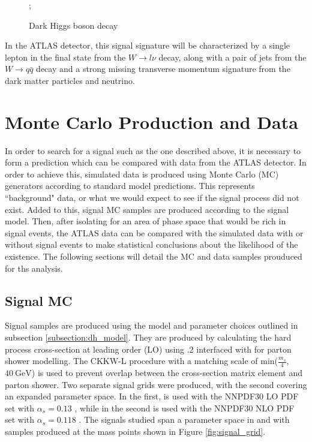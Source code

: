 \begin{figure}[H]
    \centering
    ;
    \caption{Dark Higgs boson decay}
    \label{fig:dh_feynman}
\end{figure}

In the ATLAS detector, this signal signature will be characterized by a single lepton in the final state from the $ W \rightarrow l\nu $ decay, along with a pair of jets from the $ W \rightarrow q\bar{q} $ decay and a strong missing transverse momentum signature from the dark matter particles and neutrino.

\section{Monte Carlo Production and Data}
\label{section:mc_prod}
In order to search for a signal such as the one described above, it is necessary to form a prediction which can be compared with data from the ATLAS detector. In order to achieve this, simulated data is produced using Monte Carlo (MC) generators according to standard model predictions. This represents ``background" data, or what we would expect to see if the signal process did not exist. Added to this, signal MC samples are produced according to the signal model. Then, after isolating for an area of phase space that would be rich in signal events, the ATLAS data can be compared with the simulated data with or without signal events to make statistical conclusions about the likelihood of the existence. The following sections will detail the MC and data samples prouduced for ths analysis.

\subsection{Signal MC}
\label{subsection:mc_signal}
Signal samples are produced using the model and parameter choices outlined in subsection \ref{subsection:dh_model}. They are produced by calculating the hard process cross-section at leading order (LO) using .2 \cite{MadGraph} interfaced with  \cite{Pythia} for parton shower modelling. The CKKW-L \cite{CKKW} procedure with a matching scale of min($\frac{m_s}{4}$, $40~\text{GeV}$) is used to prevent overlap between the cross-section matrix element and parton shower. Two separate signal grids were produced, with the second covering an expanded parameter space. In the first, \mgamc is used with the NNPDF30 LO PDF set with $\alpha_s = 0.13$ \cite{PDF30}, while in the second \mgamc is used with the NNPDF30 NLO PDF set with $\alpha_s = 0.118$ \cite{PDF30}. The signals studied span a parameter space in \ms and \mZp with samples produced at the mass points shown in Figure \ref{fig:signal_grid}.

